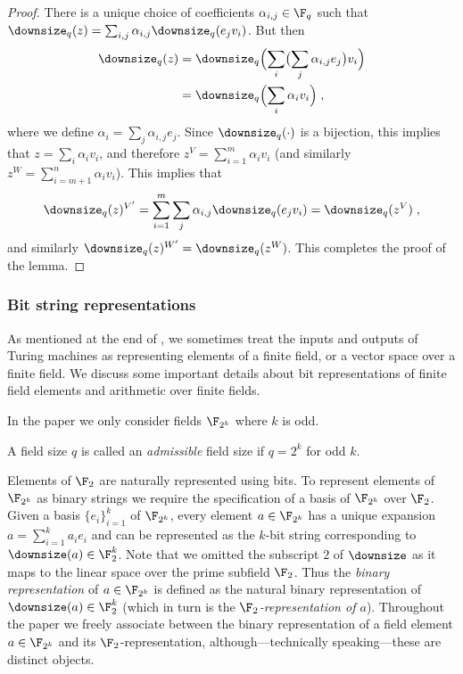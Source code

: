 \begin{proof}
  There is a unique choice of coefficients $\alpha_{i, j} \in \F_q$ such that
  $\downsize_q(z) = \sum_{i, j} \alpha_{i, j} \downsize_q(e_j v_i)$.
  But then
  \begin{align*}
    \downsize_q(z) & = \downsize_q \Bigl( \sum_i \bigl ( \sum_j
                     \alpha_{i, j} e_j \bigr) v_i \Bigr) \\
                   & = \downsize_q \Bigl( \sum_i \alpha_i v_i \Bigr)\;,
  \end{align*}
  where we define $\alpha_i = \sum_j \alpha_{i, j} e_j$.
  Since $\downsize_q(\cdot)$ is a bijection, this implies that $z = \sum_i
  \alpha_i v_i$, and therefore $z^V = \sum_{i=1}^m \alpha_i v_i$ (and similarly
  $z^W = \sum_{i=m+1}^n \alpha_i v_i$).
  This implies that
  \begin{equation*}
	  \downsize_q(z)^{V'} = \sum_{i=1}^m \sum_{j} \alpha_{i, j}
    \downsize_q(e_j v_i) = \downsize_q (z^V)\;,
  \end{equation*}
  and similarly $\downsize_q(z)^{W'} = \downsize_q(z^W)$.
  This completes the proof of the lemma.
\end{proof}

\subsubsection{Bit string representations}
\label{sec:ff-representations}

As mentioned at the end of , we sometimes treat the
inputs and outputs of Turing machines as representing elements of a finite
field, or a vector space over a finite field.
We discuss some important details about bit representations of finite field
elements and arithmetic over finite fields.

In the paper we only consider fields $\F_{2^k}$ where $k$ is odd. 

\begin{definition}\label{def:admissible-size}
  A field size $q$ is called an \emph{admissible} field size if $q=2^k$ for odd
  $k$.
\end{definition}

Elements of $\F_2$ are naturally represented using bits. 
To represent elements of $\F_{2^k}$ as binary strings we require the
specification of a basis of $\F_{2^k}$ over $\F_2$.
Given a basis $\{e_i\}_{i=1}^k$ of $\F_{2^k}$, every element $a \in \F_{2^k}$
has a unique expansion $a = \sum_{i=1}^k a_i e_i$ and can be represented as the
$k$-bit string corresponding to $\downsize(a) \in \F_2^k$.
Note that we omitted the subscript $2$ of $\downsize$ as it maps to the linear
space over the prime subfield $\F_2$.
Thus the \emph{binary representation} of $a \in \F_{2^k}$ is defined as the
natural binary representation of $\downsize(a) \in \F_2^k$ (which in turn is the
\emph{$\F_2$-representation of $a$}).
Throughout the paper we freely associate between the binary representation of a
field element $a \in \F_{2^k}$ and its $\F_2$-representation,
although---technically speaking---these are distinct objects.

